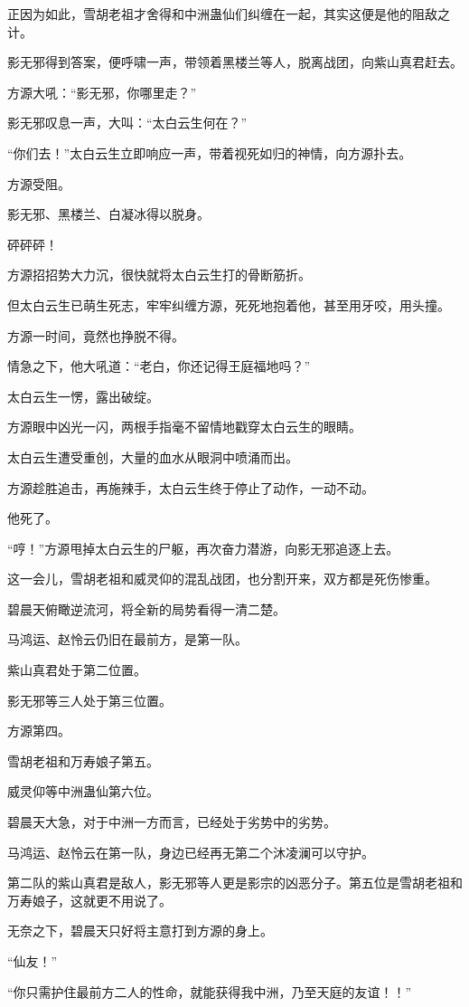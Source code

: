 \begin{this_body}
正因为如此，雪胡老祖才舍得和中洲蛊仙们纠缠在一起，其实这便是他的阻敌之计。

影无邪得到答案，便呼啸一声，带领着黑楼兰等人，脱离战团，向紫山真君赶去。

方源大吼：“影无邪，你哪里走？”

影无邪叹息一声，大叫：“太白云生何在？”

“你们去！”太白云生立即响应一声，带着视死如归的神情，向方源扑去。

方源受阻。

影无邪、黑楼兰、白凝冰得以脱身。

砰砰砰！

方源招招势大力沉，很快就将太白云生打的骨断筋折。

但太白云生已萌生死志，牢牢纠缠方源，死死地抱着他，甚至用牙咬，用头撞。

方源一时间，竟然也挣脱不得。

情急之下，他大吼道：“老白，你还记得王庭福地吗？”

太白云生一愣，露出破绽。

方源眼中凶光一闪，两根手指毫不留情地戳穿太白云生的眼睛。

太白云生遭受重创，大量的血水从眼洞中喷涌而出。

方源趁胜追击，再施辣手，太白云生终于停止了动作，一动不动。

他死了。

“哼！”方源甩掉太白云生的尸躯，再次奋力潜游，向影无邪追逐上去。

这一会儿，雪胡老祖和威灵仰的混乱战团，也分割开来，双方都是死伤惨重。

碧晨天俯瞰逆流河，将全新的局势看得一清二楚。

马鸿运、赵怜云仍旧在最前方，是第一队。

紫山真君处于第二位置。

影无邪等三人处于第三位置。

方源第四。

雪胡老祖和万寿娘子第五。

威灵仰等中洲蛊仙第六位。

碧晨天大急，对于中洲一方而言，已经处于劣势中的劣势。

马鸿运、赵怜云在第一队，身边已经再无第二个沐凌澜可以守护。

第二队的紫山真君是敌人，影无邪等人更是影宗的凶恶分子。第五位是雪胡老祖和万寿娘子，这就更不用说了。

无奈之下，碧晨天只好将主意打到方源的身上。

“仙友！”

“你只需护住最前方二人的性命，就能获得我中洲，乃至天庭的友谊！！”


\end{this_body}
